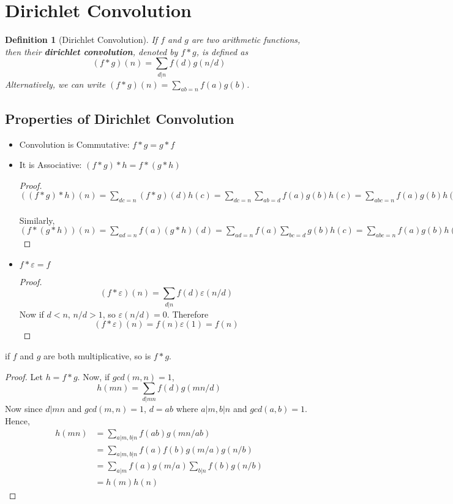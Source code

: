 \documentclass[11pt]{article}
\newtheorem{definition}{Definition}[section]
\begin{document}
\section{Dirichlet Convolution}
\begin{definition}[Dirichlet Convolution]
  If $f$ and $g$ are two arithmetic functions, then their \textbf{dirichlet convolution}, denoted by $f * g$, is defined as $$ (f * g)(n) = \sum \limits_{d | n} f(d) g(n / d) $$ Alternatively, we can write $(f * g)(n) = \sum \limits_{ab = n} f(a) g(b)$.
\end{definition}
\subsection*{Properties of Dirichlet Convolution}
\begin{itemize}
  \item Convolution is Commutative: $f * g = g * f$  
  \item It is Associative: $(f * g) * h = f * (g * h)$ 
  \begin{proof}
    $((f * g) * h)(n) = \sum \limits_{dc = n} (f * g)(d) h(c) = \sum \limits_{dc = n} \sum \limits_{ab = d} f(a) g(b) h(c) = \sum \limits_{abc = n} f(a) g(b) h(c)$
    \\ \\Similarly, 
    $(f * (g * h))(n) = \sum \limits_{ad = n} f(a) (g * h)(d) = \sum \limits_{ad = n} f(a) \sum \limits_{bc = d} g(b) h(c) = \sum \limits_{abc = n} f(a) g(b) h(c)$
  \end{proof}
  \item $f * \varepsilon = f$
  \begin{proof}
   $$(f * \varepsilon) (n) = \sum \limits_{d|n} f(d) \varepsilon(n / d)$$
  Now if $d < n$, $n / d > 1$, so $\varepsilon(n / d) = 0$. Therefore
  $$(f * \varepsilon)(n) = f(n) \varepsilon(1) = f(n)$$
  \end{proof}
\end{itemize}
\begin{theorem}
  if $f$ and $g$ are both multiplicative, so is $f * g$.
\end{theorem}
\begin{proof}
  Let $h = f * g$. Now, if $gcd(m, n) = 1$, 
  $$ h(mn) = \sum \limits_{d|mn} f(d) g(mn/d)$$
  Now since $d| mn$ and $gcd(m, n) = 1$, $d = ab$ where $a|m, b|n$ and $gcd(a, b) = 1$. Hence,
  \begin{align*}
    h(mn) &= \sum \limits_{a|m, b|n} f(ab) g(mn/ab)\\
          &= \sum \limits_{a|m, b|n} f(a) f(b) g(m/a) g(n/b)\\
          &= \sum \limits_{a | m} f(a) g(m/a) \sum \limits_{b|n} f(b) g(n/b) \\
          &= h(m) h(n)
  \end{align*}
\end{proof}
\end{document}
